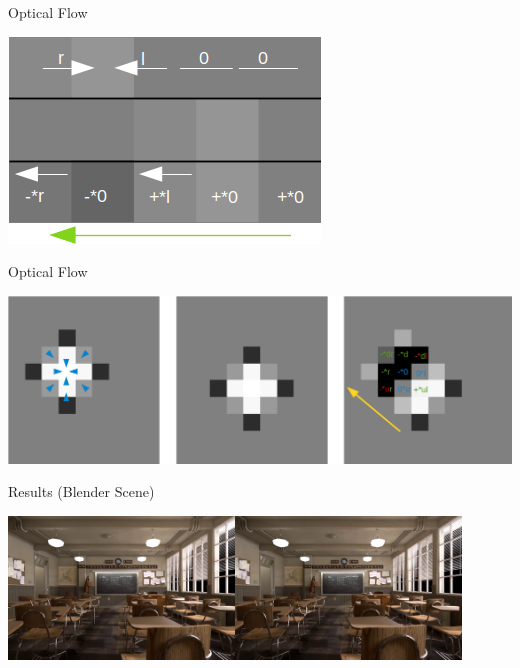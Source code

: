 \documentclass[aspectratio=169]{beamer}
\begin{document}
\begin{frame}{Optical Flow}
  \begin{center}
    \includegraphics[scale=0.6]{../img/optical_flow_intuitive_3.png}
  \end{center}
\end{frame}

\begin{frame}{Optical Flow}
  \begin{center}
    \includegraphics[scale=0.3]{../img/optical_flow_2d.png}
  \end{center}
\end{frame}


\begin{frame}{Results (Blender Scene)}
  \begin{center}
    \includegraphics[width=0.9\textwidth]{../img/blender_classroom_scene.png}
  \end{center}
\end{frame}
\end{document}
